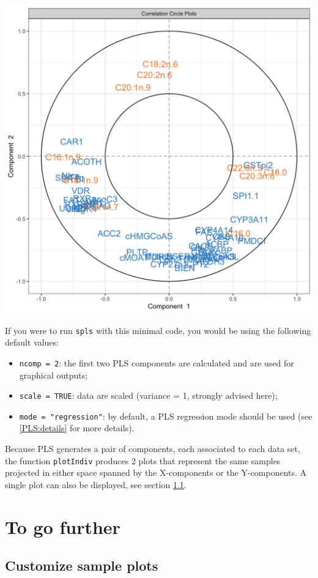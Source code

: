 \documentclass[]{book}
\providecommand{\tightlist}{%
  \setlength{\itemsep}{0pt}\setlength{\parskip}{0pt}}
\begin{document}
\begin{center}\includegraphics[width=0.75\linewidth,]{Figures/05-pls-and-plots-2} \end{center}

If you were to run \texttt{spls} with this minimal code, you would be using the following default values:

\begin{itemize}
\tightlist
\item
  \texttt{ncomp\ =\ 2}: the first two PLS components are calculated and are used for graphical outputs;
\item
  \texttt{scale\ =\ TRUE}: data are scaled (variance = 1, strongly advised here);
\item
  \texttt{mode\ =\ "regression"}: by default, a PLS regression mode should be used (see \ref{PLS:details} for more details).
\end{itemize}

Because PLS generates a pair of components, each associated to each data set, the function \texttt{plotIndiv} produces 2 plots that represent the same samples projected in either space spanned by the X-components or the Y-components. A single plot can also be displayed, see section \ref{pls:plotIndiv}.

\hypertarget{pls-tgf}{%
\section{To go further}\label{pls-tgf}}

\hypertarget{pls:plotIndiv}{%
\subsection{Customize sample plots}\label{pls:plotIndiv}}
\end{document}
